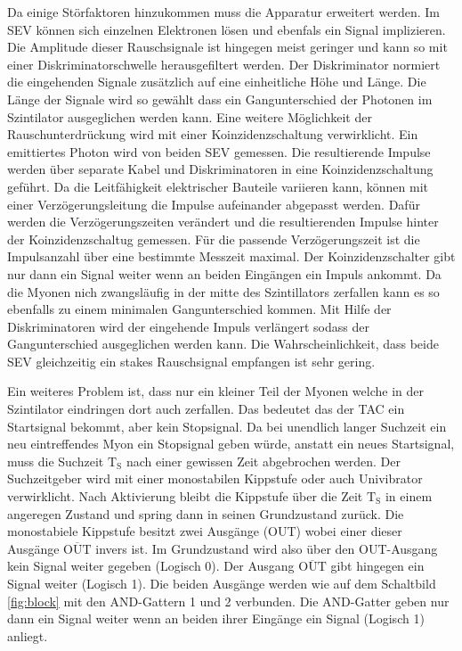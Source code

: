 Da einige Störfaktoren hinzukommen muss die Apparatur erweitert werden.
Im SEV können sich einzelnen Elektronen lösen und ebenfals ein Signal implizieren.
Die Amplitude dieser Rauschsignale ist hingegen meist geringer und kann so mit einer Diskriminatorschwelle herausgefiltert werden.
Der Diskriminator normiert die eingehenden Signale zusätzlich auf eine einheitliche Höhe und Länge.
Die Länge der Signale wird so gewählt dass ein Gangunterschied der Photonen im Szintilator ausgeglichen werden kann.
Eine weitere Möglichkeit der Rauschunterdrückung wird mit einer Koinzidenzschaltung verwirklicht.
Ein emittiertes Photon wird von beiden SEV gemessen.
Die resultierende Impulse werden über separate Kabel und Diskriminatoren in eine Koinzidenzschaltung geführt.
Da die Leitfähigkeit elektrischer Bauteile variieren kann,
können mit einer Verzögerungsleitung die Impulse aufeinander abgepasst werden.
Dafür werden die Verzögerungszeiten verändert und die resultierenden Impulse hinter der Koinzidenzschaltug gemessen.
Für die passende Verzögerungszeit ist die Impulsanzahl über eine bestimmte Messzeit maximal.
Der Koinzidenzschalter gibt nur dann ein Signal weiter wenn an beiden Eingängen ein Impuls ankommt.
Da die Myonen nich zwangsläufig in der mitte des Szintillators zerfallen kann es so ebenfalls zu einem minimalen Gangunterschied kommen.
Mit Hilfe der Diskriminatoren wird der eingehende Impuls verlängert sodass der Gangunterschied ausgeglichen werden kann.
Die Wahrscheinlichkeit, dass beide SEV gleichzeitig ein stakes Rauschsignal empfangen ist sehr gering.

Ein weiteres Problem ist, dass nur ein kleiner Teil der Myonen welche in der Szintilator eindringen dort auch zerfallen.
Das bedeutet das der TAC ein Startsignal bekommt, aber kein Stopsignal.
Da bei unendlich langer Suchzeit ein neu eintreffendes Myon ein Stopsignal geben würde, anstatt ein neues Startsignal,
muss die Suchzeit $\text{T}_{\text{S}}$ nach einer gewissen Zeit abgebrochen werden.
Der Suchzeitgeber wird mit einer monostabilen Kippstufe oder auch Univibrator verwirklicht.
Nach Aktivierung bleibt die Kippstufe über die Zeit $\text{T}_{\text{S}}$ in einem angeregen Zustand und spring dann in seinen Grundzustand zurück.
Die monostabiele Kippstufe besitzt zwei Ausgänge (OUT) wobei einer dieser Ausgänge $\overline{\text{OUT}}$ invers ist.
Im Grundzustand wird also über den OUT-Ausgang kein Signal weiter gegeben (Logisch 0).
Der Ausgang $\overline{\text{OUT}}$ gibt hingegen ein Signal weiter (Logisch 1).
Die beiden Ausgänge werden wie auf dem Schaltbild \ref{fig:block} mit den AND-Gattern 1 und 2 verbunden.
Die AND-Gatter geben nur dann ein Signal weiter wenn an beiden ihrer Eingänge ein Signal (Logisch 1) anliegt.

